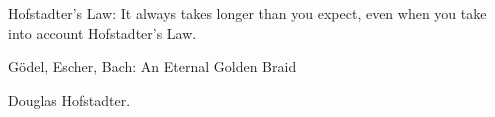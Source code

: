 \epigraph{
	Hofstadter's Law: It always takes longer than you expect, even when you take into account Hofstadter's Law.
}{
Gödel, Escher, Bach: An Eternal Golden Braid

Douglas Hofstadter.
}